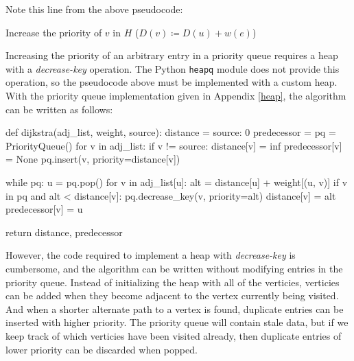 \documentclass[12pt, titlepage]{article}
\begin{document}
Note this line from the above pseudocode:
\begin{center}
    Increase the priority of $v$ in $H$\hspace{4mm} ($D(v)\coloneqq D(u) + w(e)$)
\end{center}
Increasing the priority of an arbitrary entry in a priority queue requires a heap with a \textit{decrease-key} operation. The Python \texttt{heapq} module does not provide this operation, so the pseudocode above must be implemented with a custom heap. With the priority queue implementation given in Appendix \ref{heap}, the algorithm can be written as follows: \medskip

\begin{python}
def dijkstra(adj_list, weight, source):
    distance = {source: 0}
    predecessor = {}
    pq = PriorityQueue()
    for v in adj_list:
        if v != source:
            distance[v] = inf
            predecessor[v] = None
        pq.insert(v, priority=distance[v])

    while pq:
        u = pq.pop()
        for v in adj_list[u]:
            alt = distance[u] + weight[(u, v)]
            if v in pq and alt < distance[v]:
                pq.decrease_key(v, priority=alt)
                distance[v] = alt
                predecessor[v] = u

    return distance, predecessor
\end{python}

However, the code required to implement a heap with \textit{decrease-key} is cumbersome, and the algorithm can be written without modifying entries in the priority queue. Instead of initializing the heap with all of the verticies, verticies can be added when they become adjacent to the vertex currently being visited. And when a shorter alternate path to a vertex is found, duplicate entries can be inserted with higher priority. The priority queue will contain stale data, but if we keep track of which verticies have been visited already, then duplicate entries of lower priority can be discarded when popped. \\
\end{document}
